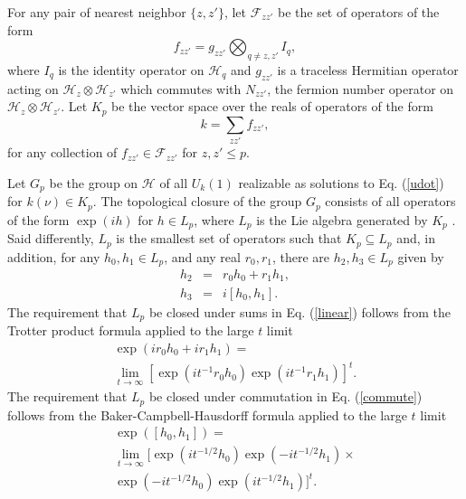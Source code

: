 \documentclass[12pt,amsmath,amssymb,onecolumn]{revtex4-2}
\begin{document}
For any pair of nearest neighbor  $\{z, z'\}$, let
$\mathcal{F}_{z z'}$ be the set of operators
of the form
\begin{equation}
\label{defhfa}
f_{zz'} =  g_{zz'} \bigotimes_{q \ne z,z'} I_q,
\end{equation}
where $I_q$ is the identity operator on $\mathcal{H}_q$
and $g_{zz'}$
is a traceless Hermitian operator acting on
$\mathcal{H}_z \otimes \mathcal{H}_{z'}$ which commutes with $N_{zz'}$, the fermion
number operator on $\mathcal{H}_z \otimes \mathcal{H}_{z'}$.
Let $K_p$ be the vector space over the reals of operators
of the form
\begin{equation}
\label{defka}
k = \sum_{zz'} f_{zz'},
\end{equation}
for any collection of
$f_{z z'} \in \mathcal{F}_{zz'}$ for $z, z' \le p$.

Let $G_p$ be the group on 
$\mathcal{H}$
of all $U_k(1)$ realizable as solutions to Eq. (\ref{udot}) 
for $k(\nu) \in K_p$. 
The topological closure of the group
$G_p$ consists of all operators of the form
$\exp( i h)$ for $h \in L_p$, where $L_p$ is the 
Lie algebra generated by $K_p$ \cite{Divincenzo}.
Said differently,  $L_p$ is the smallest set of operators 
such that  $K_p \subseteq L_p$ and, in addition, for
any $h_0, h_1 \in L_p$, and any real $r_0, r_1$,
there are $h_2, h_3 \in L_p$ given by
\begin{subequations}
\begin{eqnarray}
\label{linear}
h_2 & = & r_0 h_0 + r_1 h_1, \\
\label{commute}
h_3 & = & i [ h_0, h_1].
\end{eqnarray}
\end{subequations}
The requirement that $L_p$ be closed under
sums in Eq. (\ref{linear}) follows from the Trotter product
formula applied to the large $t$ limit 
\begin{multline}
\label{linearx}
\exp( i r_0 h_0 + i r_1 h_1) = \\
\lim_{t \rightarrow \infty }[ \exp( i t^{-1}r_0 h_0) \exp( i t^{-1} r_1 h_1)]^t.
\end{multline}
The requirement that $L_p$ be closed under commutation in
Eq. (\ref{commute}) follows from the 
Baker-Campbell-Hausdorff 
formula applied to the large $t$ limit 
\begin{multline}
\label{commutex}
\exp( [ h_0, h_1]) = \\ \lim_{t \rightarrow \infty}
[ \exp( i t^{-1/2} h_0) \exp( -i t^{-1/2} h_1) \times \\  
\exp( -i t^{-1/2} h_0) \exp( i t^{-1/2} h_1)]^t.
\end{multline}
\end{document}
